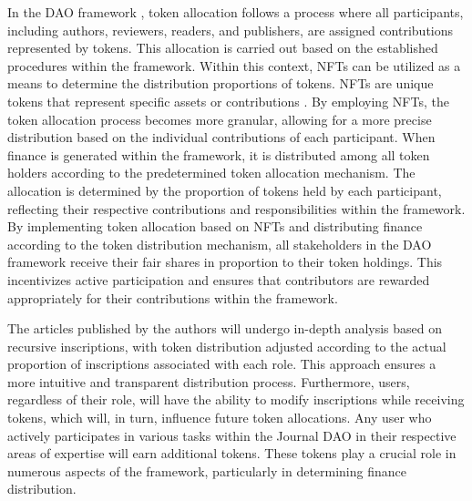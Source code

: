 \documentclass[lettersize,journal]{IEEEtran}
\begin{document}
In the DAO framework \cite{hsieh2018bitcoin}, token allocation follows a process where all participants, including authors, reviewers, readers, and publishers, are assigned contributions represented by tokens. This allocation is carried out based on the established procedures within the framework.
Within this context, NFTs can be utilized as a means to determine the distribution proportions of tokens. NFTs are unique tokens that represent specific assets or contributions \cite{10034436}. By employing NFTs, the token allocation process becomes more granular, allowing for a more precise distribution based on the individual contributions of each participant.
When finance is generated within the framework, it is distributed among all token holders according to the predetermined token allocation mechanism. The allocation is determined by the proportion of tokens held by each participant, reflecting their respective contributions and responsibilities within the framework.
By implementing token allocation based on NFTs and distributing finance according to the token distribution mechanism, all stakeholders in the DAO framework receive their fair shares in proportion to their token holdings. This incentivizes active participation and ensures that contributors are rewarded appropriately for their contributions within the framework.

The articles published by the authors will undergo in-depth analysis based on recursive inscriptions, with token distribution adjusted according to the actual proportion of inscriptions associated with each role. This approach ensures a more intuitive and transparent distribution process. Furthermore, users, regardless of their role, will have the ability to modify inscriptions while receiving tokens, which will, in turn, influence future token allocations. Any user who actively participates in various tasks within the Journal DAO in their respective areas of expertise will earn additional tokens. These tokens play a crucial role in numerous aspects of the framework, particularly in determining finance distribution.
\end{document}

